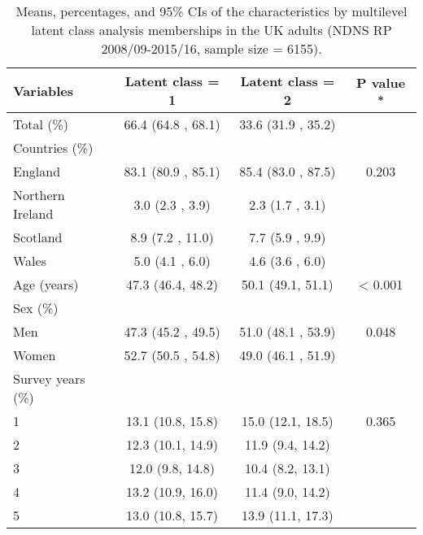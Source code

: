 \begin{table}
	\caption{\label{tab:}Means, percentages, and 95\% CIs of the characteristics by multilevel latent class analysis memberships in the UK adults (NDNS RP 2008/09-2015/16, sample size = 6155).}\vspace{-0.3cm}
		\centering
		\fontsize{9}{10}\selectfont
		\begin{tabular}[t]{lccc}
			\hiderowcolors
			\toprule
			Variables & Latent class = 1 & Latent class = 2 & P value \textsuperscript{*}\\
			\midrule
			\showrowcolors
			Total (\%) & 66.4  (64.8 , 68.1) & 33.6  (31.9 , 35.2) & \\
			Countries (\%) &  &  & \\
			\hspace{1em}England & 83.1  (80.9 , 85.1) & 85.4  (83.0 , 87.5) & 0.203\\
			\hspace{1em}Northern Ireland & 3.0  (2.3 , 3.9) & 2.3  (1.7 , 3.1) & \\
			\hspace{1em}Scotland & 8.9  (7.2 , 11.0) & 7.7  (5.9 , 9.9) & \\
			\hspace{1em}Wales & 5.0  (4.1 , 6.0) & 4.6  (3.6 , 6.0) & \\
			Age (years) & 47.3 (46.4, 48.2) & 50.1 (49.1, 51.1) & < 0.001\\
			Sex (\%) &  &  & \\
			\hspace{1em}Men & 47.3  (45.2 , 49.5) & 51.0  (48.1 , 53.9) & 0.048\\
			\hspace{1em}Women & 52.7  (50.5 , 54.8) & 49.0  (46.1 , 51.9) & \\
			Survey years (\%) &  &  & \\
			\hspace{1em}1 & 13.1 (10.8, 15.8) & 15.0 (12.1, 18.5) & 0.365\\
			\hspace{1em}2 & 12.3 (10.1, 14.9) & 11.9 (9.4, 14.2) & \\
			\hspace{1em}3 & 12.0 (9.8, 14.8) & 10.4 (8.2, 13.1) & \\
			\hspace{1em}4 & 13.2 (10.9, 16.0) & 11.4 (9.0, 14.2) & \\
			\hspace{1em}5 & 13.0 (10.8, 15.7) & 13.9 (11.1, 17.3) & \\

\end{tabular}
\end{table}
